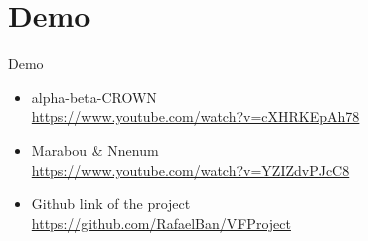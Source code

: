 \documentclass[9pt]{beamer}
\begin{document}
\section{Demo}
\begin{frame}[plain,c]{Demo}
\begin{itemize}
    \item alpha-beta-CROWN\\
    \url{https://www.youtube.com/watch?v=cXHRKEpAh78}
    \item Marabou \& Nnenum\\
    \url{https://www.youtube.com/watch?v=YZIZdvPJcC8}
    \item Github link of the project\\
    \url{https://github.com/RafaelBan/VFProject}
\end{itemize}
\end{frame}
\end{document}
